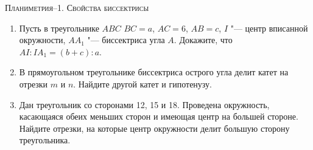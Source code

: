 \documentclass[a4paper, 11pt]{article}
\begin{document}
\begin{center}
\scshape\Large Планиметрия--1. Свойства биссектрисы
\end{center}

\vfill


\begin{enumerate}[\bf 1.]
\item Пусть в треугольнике $ABC$ $BC=a$, $AC=6$, $AB = c$,
$I$ "--- центр вписанной окружности, $AA_1$ "--- биссектриса 
угла $A$. Докажите, что $AI:IA_1 = (b+c):a$.
\item В прямоугольном треугольнике биссектриса 
острого угла делит катет на отрезки $m$ и $n$. Найдите другой катет
и гипотенузу.
\item Дан треугольник со сторонами 12, 15 и 18. 
Проведена окружность, касающаяся обеих меньших сторон и 
имеющая центр на большей стороне. Найдите отрезки, на 
которые центр окружности делит большую сторону треугольника.
 

\end{enumerate}
\end{document}
